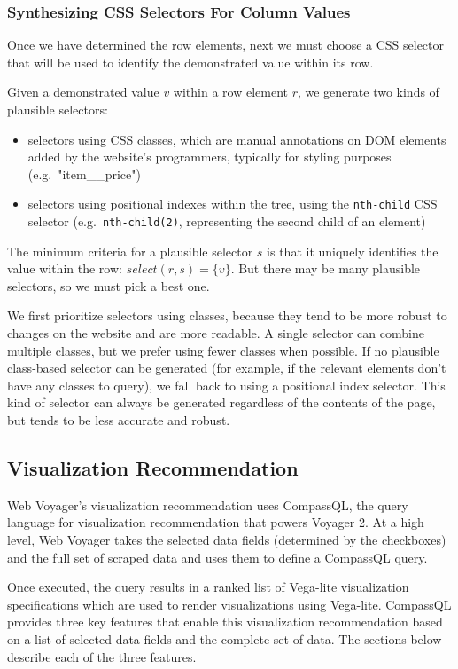\documentclass{vgtc}                          %
\begin{document}
\subsubsection{Synthesizing CSS Selectors For Column
Values}

Once we have determined the row elements, next we must choose a CSS
selector that will be used to identify the demonstrated value within its
row.

Given a demonstrated value \(v\) within a row element \(r\), we generate
two kinds of plausible selectors:

\begin{itemize}
\item
  selectors using CSS classes, which are manual annotations on DOM
  elements added by the website's programmers, typically for styling
  purposes (e.g.~"item\_\_price")
\item
  selectors using positional indexes within the tree, using the
  \texttt{nth-child} CSS selector (e.g.~\texttt{nth-child(2)},
  representing the second child of an element)
\end{itemize}

The minimum criteria for a plausible selector \(s\) is that it uniquely
identifies the value within the row: \(select(r, s) = \{v\}\). But there
may be many plausible selectors, so we must pick a best one.

We first prioritize selectors using classes, because they tend to be
more robust to changes on the website and are more readable. A single
selector can combine multiple classes, but we prefer using fewer classes
when possible. If no plausible class-based selector can be generated
(for example, if the relevant elements don't have any classes to query),
we fall back to using a positional index selector. This kind of selector
can always be generated regardless of the contents of the page, but
tends to be less accurate and robust.

\subsection{Visualization Recommendation}

Web Voyager's visualization recommendation uses CompassQL, the query
language for visualization recommendation that powers Voyager 2. At a
high level, Web Voyager takes the selected data fields (determined by
the checkboxes) and the full set of scraped data and uses them to define
a CompassQL query.

Once executed, the query results in a ranked list of Vega-lite
\cite{satyanarayan2017} visualization specifications which are used to
render visualizations using Vega-lite. CompassQL provides three key
features that enable this visualization recommendation based on a list
of selected data fields and the complete set of data. The sections below
describe each of the three features.
\end{document}
